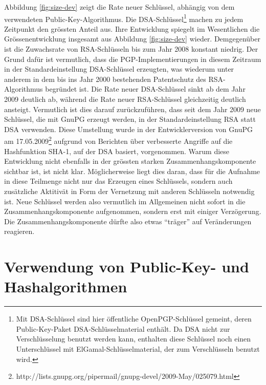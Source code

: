 Abbildung \ref{fig:size-dev} zeigt die Rate neuer Schl\"ussel,
abh\"angig von dem verwendeten Public-Key-Algorithmus. Die
DSA-Schl\"ussel\footnote{Mit DSA-Schl\"ussel sind hier \"offentliche
  OpenPGP-Schl\"ussel gemeint, deren Public-Key-Paket
  DSA-Schl\"usselmaterial enth\"alt. Da DSA nicht zur
  Verschl\"usselung benutzt werden kann, enthalten diese Schl\"ussel
  noch einen Unterschl\"ussel mit ElGamal-Schl\"usselmaterial, der zum
  Verschl\"usseln benutzt wird.} machen zu jedem Zeitpunkt den
gr\"ossten Anteil aus. Ihre Entwicklung spiegelt im Wesentlichen die
Gr\"ossenentwicklung insgesamt aus Abbildung \ref{fig:size-dev}
wieder. Demgegen\"uber ist die Zuwachsrate von RSA-Schl\"usseln bis
zum Jahr 2008 konstant niedrig. Der Grund daf\"ur ist vermutlich, dass
die PGP-Implementierungen in diesem Zeitraum in der
Standardeinstellung DSA-Schl\"ussel erzeugten, was wiederum unter
anderem in dem bis ins Jahr 2000 bestehenden Patentschutz des
RSA-Algorithmus begr\"undet ist.  Die Rate neuer DSA-Schl\"ussel sinkt
ab dem Jahr 2009 deutlich ab, w\"ahrend die Rate neuer RSA-Schl\"ussel
gleichzeitig deutlich ansteigt. Vermutlich ist dies darauf
zur\"uckzuf\"uhren, dass seit dem Jahr 2009 neue Schl\"ussel, die mit
GnuPG erzeugt werden, in der Standardeinstellung RSA statt DSA
verwenden. Diese Umstellung wurde in der Entwicklerversion von GnuPG
am
17.05.2009\footnote{http://lists.gnupg.org/pipermail/gnupg-devel/2009-May/025079.html}
aufgrund von Berichten \"uber verbesserte Angriffe auf die
Hashfunktion SHA-1\cite{McDonald2009}, auf der DSA basiert,
vorgenommen. Warum diese Entwicklung nicht ebenfalls in der gr\"ossten
starken Zusammenhangskomponente sichtbar ist, ist nicht
klar. M\"oglicherweise liegt dies daran, dass f\"ur die Aufnahme in
diese Teilmenge nicht nur das Erzeugen eines Schl\"ussels, sondern
auch zus\"atzliche Aktitiv\"at in Form der Vernetzung mit anderen
Schl\"usseln notwendig ist. Neue Schl\"ussel werden also vermutlich im
Allgemeinen nicht sofort in die Zusammenhangskomponente aufgenommen,
sondern erst mit einiger Verz\"ogerung. Die Zusammenhangskomponente
d\"urfte also etwas ``tr\"ager'' auf Ver\"anderungen reagieren.

\section{Verwendung von Public-Key- und Hashalgorithmen}
\label{sec:public-key-und}

